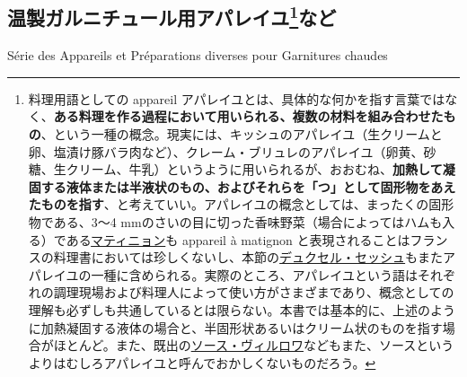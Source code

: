 \newpage

\begin{main}

\hypertarget{serie-des-appareiles-et-preparations-diverses-pour-garnitures-chaudes}{%
\section[温製ガルニチュール用アパレイユなど]{\texorpdfstring{温製ガルニチュール用アパレイユ\footnote{料理用語としての
  appareil
  アパレイユとは、具体的な何かを指す言葉ではなく、\textbf{ある料理を作る過程において用いられる、複数の材料を組み合わせたもの}、という一種の概念。現実には、キッシュのアパレイユ（生クリームと卵、塩漬け豚バラ肉など）、クレーム・ブリュレのアパレイユ（卵黄、砂糖、生クリーム、牛乳）というように用いられるが、おおむね、\textbf{加熱して凝固する液体または半液状のもの、およびそれらを「つ」として固形物をあえたものを指す}、と考えていい。アパレイユの概念としては、まったくの固形物である、3〜4
  mmのさいの目に切った香味野菜（場合によってはハムも入る）である\protect\hyperlink{matignon}{マティニョン}も
  appareil à matignon
  と表現されることはフランスの料理書においては珍しくないし、本節の\protect\hyperlink{duxelles-seche}{デュクセル・セッシュ}もまたアパレイユの一種に含められる。実際のところ、アパレイユという語はそれぞれの調理現場および料理人によって使い方がさまざまであり、概念としての理解も必ずしも共通しているとは限らない。本書では基本的に、上述のように加熱凝固する液体の場合と、半固形状あるいはクリーム状のものを指す場合がほとんど。また、既出の\protect\hyperlink{sauce-villeroy}{ソース・ヴィルロワ}などもまた、ソースというよりはむしろアパレイユと呼んでおかしくないものだろう。}など}{温製ガルニチュール用アパレイユなど}}\label{serie-des-appareiles-et-preparations-diverses-pour-garnitures-chaudes}}

\begin{frsecenv}

Série des Appareils et Préparations diverses pour Garnitures chaudes

\end{frsecenv}


\end{main}

